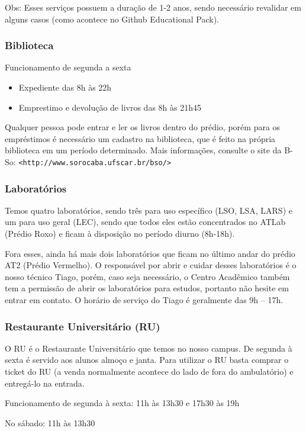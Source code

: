 Obs: Esses serviços possuem a duração de 1-2 anos, sendo necessário revalidar em alguns casos (como acontece no Github Educational Pack).

\subsubsection{Biblioteca}
\noindent Funcionamento de segunda a sexta
\begin{itemize}
  \item Expediente das 8h às 22h
  \item Emprestimo e devolução de livros das 8h às 21h45
\end{itemize}
\noindent Qualquer pessoa pode entrar e ler os livros dentro do prédio, porém para os empréstimos é necessário um cadastro na biblioteca, que é feito na própria biblioteca em um período determinado.
\newline \newline Mais informações, consulte o site da B-So:
\texttt{<http://www.sorocaba.ufscar.br/bso/>}

\subsubsection{Laboratórios}
Temos quatro laboratórios, sendo três para uso específico (LSO, LSA, LARS) e um para uso geral (LEC), sendo que todos eles estão
concentrados no ATLab (Prédio Roxo) e ficam à disposição no período diurno (8h-18h).

Fora esses, ainda há mais dois laboratórios que ficam no último andar do prédio AT2 (Prédio Vermelho).
O responsável por abrir e cuidar desses laboratórios é o nosso técnico Tiago,
porém, caso seja necessário, o Centro Acadêmico também tem a permissão de 
abrir os laboratórios para estudos, portanto não hesite em entrar em contato. 
O horário de serviço do Tiago é geralmente das 9h -- 17h.

\subsubsection{Restaurante Universitário (RU)}
O RU é o Restaurante Universitário que temos no nosso campus. De segunda à sexta é servido aos alunos almoço e janta. Para utilizar o RU basta comprar o ticket do RU (a venda normalmente acontece do lado de fora do ambulatório) e entregá-lo na entrada.

Funcionamento de segunda à sexta: 11h às 13h30 e 17h30 às 19h

No sábado: 11h às 13h30

